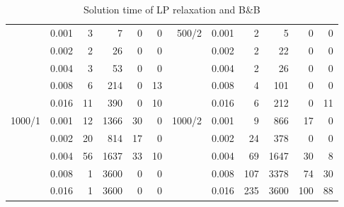 \begin{table}[]
\begin{tabular}{rrrrrr|rrrrrr}
 & 0.001 & 3   &  7 & 0 & 0 &\multirow{5}{*}{500/2} & 0.001 &  2  &  5 & 0   & 0 \\
 & 0.002 & 2   & 26 & 0 & 0 & 		  	    & 0.002 &  2  & 22 & 0   & 0 \\
 & 0.004 & 3   & 53 & 0 & 0 & 		  	    & 0.004 &  2  & 26 & 0   & 0 \\
 & 0.008 & 6   &214 & 0 &13 & 		  	    & 0.008 &  4  &101 & 0   & 0 \\
 & 0.016 &11   &390 & 0 &10 & 		  	    & 0.016 &  6  &212 & 0   &11 \\
\hline %
\multirow{5}{*}{1000/1} 
 & 0.001 & 12  &1366& 30& 0 &\multirow{5}{*}{1000/2} & 0.001 &  9  &866   & 17 & 0  \\
 & 0.002 & 20  & 814& 17& 0 & 			     & 0.002 &  24 &378   & 0  & 0  \\
 & 0.004 & 56  &1637& 33&10 & 			     & 0.004 &  69 &1647  & 30 & 8  \\
 & 0.008 &  1  &3600& 0 & 0 & 			     & 0.008 &  107&3378  & 74 &30  \\
 & 0.016 &  1  &3600& 0 & 0 & 			     & 0.016 &  235&3600  &100 &88  \\
\hline                                     
\end{tabular}
\caption{Solution time of LP relaxation and B\&B}
\label{tab:soltime}
\end{table}


